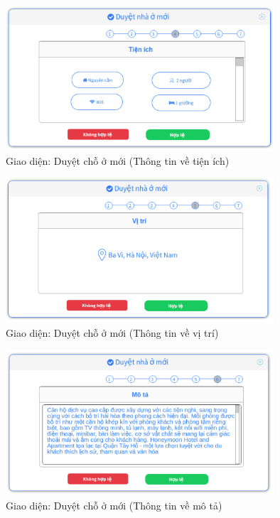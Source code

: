 \begin{figure}[H]
	\centering
	\includegraphics[width=10cm]{Image/uiTan4.png}
	\vspace{0.5cm}
	\caption{Giao diện: Duyệt chỗ ở mới (Thông tin về tiện ích)}
\end{figure}

\begin{figure}[H]
	\centering
	\includegraphics[width=10cm]{Image/uiTan5.png}
	\vspace{0.5cm}
	\caption{Giao diện: Duyệt chỗ ở mới (Thông tin về vị trí)}
\end{figure}

\begin{figure}[H]
	\centering
	\includegraphics[width=10cm]{Image/uiTan6.png}
	\vspace{0.5cm}
	\caption{Giao diện: Duyệt chỗ ở mới (Thông tin về mô tả)}
\end{figure}

